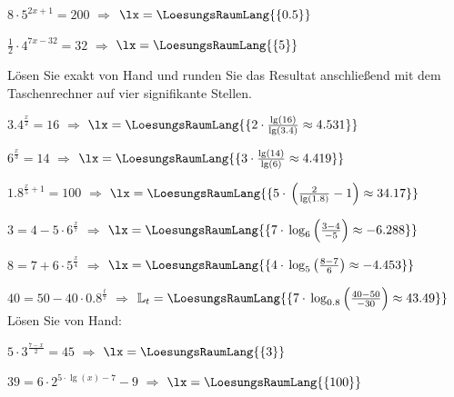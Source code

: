 \begin{bbwAufgabenBlock}
\item $8\cdot{} 5^{2x+1} = 200$  $\Longrightarrow$ $\lx=\LoesungsRaumLang{\{ 0.5 \}}$ \plz{}


\item $\frac12 \cdot{} 4^{7x-32} = 32$  $\Longrightarrow$ $\lx=\LoesungsRaumLang{\{ 5 \}}$ \plz{}

Lösen Sie exakt von Hand und runden Sie das Resultat anschließend mit dem Taschenrechner auf vier signifikante Stellen.

\item $3.4^{\frac{x}2} = 16$  $\Longrightarrow$
$\lx=\LoesungsRaumLang{\{2\cdot{} \frac{\lg(16)}{\lg(3.4)} \approx 4.531 \}}$ \plz{}
\noTRAINER{\newpage}
\item $6^{\frac{x}3} = 14$  $\Longrightarrow$
$\lx=\LoesungsRaumLang{\{3\cdot{} \frac{\lg(14)}{\lg(6)} \approx 4.419 \}}$ \plz{}

\item $1.8^{\frac{x}5+1} = 100$  $\Longrightarrow$
$\lx=\LoesungsRaumLang{\{5\cdot{}\left(\frac{2}{\lg(1.8)} - 1\right) \approx 34.17 \}}$ \plz{}


\item $3 = 4 - 5\cdot{}6^\frac{x}7$  $\Longrightarrow$ $\lx=\LoesungsRaumLang{\{ 7\cdot{} \log_{6}\left(\frac{3-4}{-5}\right)  \approx  -6.288 \}}$ \plz{}

\item $8 = 7 + 6\cdot{}5^\frac{x}4$  $\Longrightarrow$ $\lx=\LoesungsRaumLang{\{ 4\cdot{} \log_{5}\left(\frac{8-7}{6}\right)  \approx -4.453 \}}$ \plz{}

\item $40 = 50 - 40\cdot{}0.8^\frac{t}7$  $\Longrightarrow$ $\mathbb{L}_t=\LoesungsRaumLang{\{ 7\cdot{} \log_{0.8}\left(\frac{40-50}{-30}\right)  \approx 43.49 \}}$ \plz{}
\\
Lösen Sie von Hand:

\item $5 \cdot{} 3^{\frac{7-x}{2}} = 45$  $\Longrightarrow$ $\lx=\LoesungsRaumLang{\{  3   \}}$ \plz{}

\item $39 =  6\cdot{} 2 ^{5\cdot{} \lg(x) - 7} - 9$  $\Longrightarrow$ $\lx = \LoesungsRaumLang{\{ 100 \}}$ \plz{}



\end{bbwAufgabenBlock}

\platzFuerBerechnungenBisEndeSeite{}\TRAINER{\newpage}

